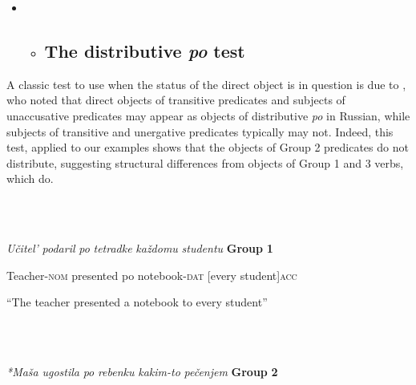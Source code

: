 \documentclass[output=paper,modfonts, nonflat]{langsci/langscibook}
\begin{document}
\begin{itemize}
\item \begin{itemize}
\item \subsection{The distributive \textit{po} test}
\end{itemize}
\end{itemize}

A classic test to use when the status of the direct object is in question is due to \citet{Pesetsky1982}, who noted that direct objects of transitive predicates and subjects of unaccusative predicates may appear as objects of distributive \textit{po} in Russian, while subjects of transitive and unergative predicates typically may not. Indeed, this test, applied to our examples shows that the objects of Group 2 predicates do not distribute, suggesting structural differences from objects of Group 1 and 3 verbs, which do.

\begin{styleinnerExample}
\ea%
    \label{ex:key:22}
    \gll\\
        \\
    \glt
    \z

          \textit{Učitel’}            \textit{podaril}    \textit{po} \textit{tetradke}            \textit{každomu} \textit{studentu}   \textbf{Group} \textbf{1}
\end{styleinnerExample}

\begin{styleinnerExample}
  Teacher-\textsc{nom} presented po notebook-\textsc{dat} [every      student]\textsc{acc}
\end{styleinnerExample}

\begin{styleinnerExample}
  “The teacher presented a notebook to every student”
\end{styleinnerExample}

\begin{styleinnerExample}
\ea%
    \label{ex:key:23}
    \gll\\
        \\
    \glt
    \z

          \textit{*Maša}            \textit{ugostila} \textit{po} \textit{rebenku}     \textit{kakim-to} \textit{pečenjem}   \textbf{Group} \textbf{2}
\end{styleinnerExample}
\end{document}
